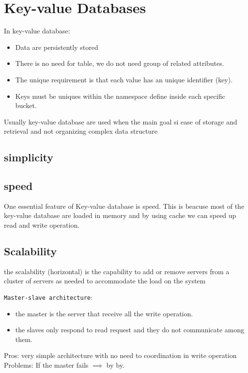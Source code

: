 \section{Key-value Databases}

In key-value database:
\begin{itemize}
    \item Data are persistently stored
    \item There is no need for table, we do not need group of related attributes.
    \item The unique requirement is that each value has an unique identifier (key).
    \item Keys must be uniques within the namespace define inside each specific bucket.
\end{itemize}

Usually key-value database are used when the main goal si ease of storage and retrieval and not organizing complex data structure


\subsection{simplicity}


\subsection{speed}
One essential feature of Key-value database is speed. This is beacuse most of the key-value database are loaded in memory and by using cache we can speed up read and write operation.

\subsection{Scalability}
\begin{definition}
    the scalability (horizontal) is the capability to add or remove servers from a cluster of servers as needed to accommodate the load on the system
\end{definition}

\texttt{Master-slave architecture}: 
\begin{itemize}
    \item the master is the server that receive all the write operation.
    \item the slaves only respond to read request and they do not communicate among them.
\end{itemize}

Pros: very simple architecture with no need to coordination in write operation
Problems: If the master fails $\implies$ by by.

